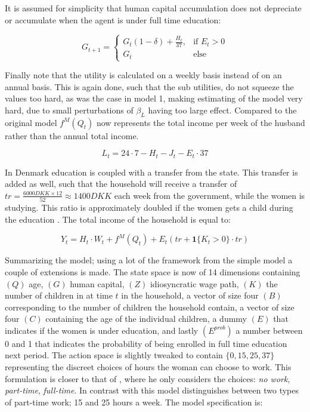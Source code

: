It is assumed for simplicity that human capital accumulation does not depreciate or accumulate when the agent is under full time education:

\begin{equation}
    G_{t+1} = 
    \begin{cases}
        G_t(1 - \delta) + \frac{H_t}{37}, & \text{if } E_t > 0 \\
        G_t & \text{else}
    \end{cases}
\end{equation}


Finally note that the utility is calculated on a weekly basis instead of on an annual basis. This is again done, such that the sub utilities, do not squeeze the values too hard, as was the case in model 1, making estimating of the model very hard, due to small perturbations of $\beta_L$ having too large effect. Compared to the original model $f^M(Q_t)$ now represents the total income per week of the husband rather than the annual total income.

\begin{equation}
    L_t = 24 \cdot 7 - H_t - J_t - E_t \cdot 37
\end{equation}

In Denmark education is coupled with a transfer from the state. This transfer is added as well, such that the household will receive a transfer of $tr = \frac{6000 DKK \times 12}{52} \approx 1400 DKK$ each week from the government, while the women is studying. This ratio is approximately doubled if the women gets a child during the education \parencite{noauthor_satser_nodate-1}. The total income of the household is equal to:

\begin{equation}
    Y_t = H_t \cdot W_t + f^M(Q_t) + E_t (tr + \mathbf{1} \{ K_t > 0 \} \cdot tr)  
\end{equation}


Summarizing the model; using a lot of the framework from the simple model a couple of extensions is made. The state space is now of 14 dimensions containing $(Q)$ age, $(G)$ human capital, $(Z)$ idiosyncratic wage path, $(K)$ the number of children in at time $t$ in the household, a vector of size four $(B)$ corresponding to the number of children the household contain, a vector of size four $(C)$ containing the age of the individual children, a dummy $(E)$ that indicates if the women is under education, and lastly $(E^{prob})$ a number between 0 and 1 that indicates the probability of being enrolled in full time education next period. The action space is slightly tweaked to contain $\{ 0, 15, 25, 37\}$ representing the discreet choices of hours the woman can choose to work. This formulation is closer to that of \textcite{francesconi_joint_2002}, where he only considers the choices: \textit{no work}, \textit{part-time}, \textit{full-time}. In contrast with \textcite{francesconi_joint_2002} this model distinguishes between two types of part-time work; 15 and 25 hours a week. The model specification is:

